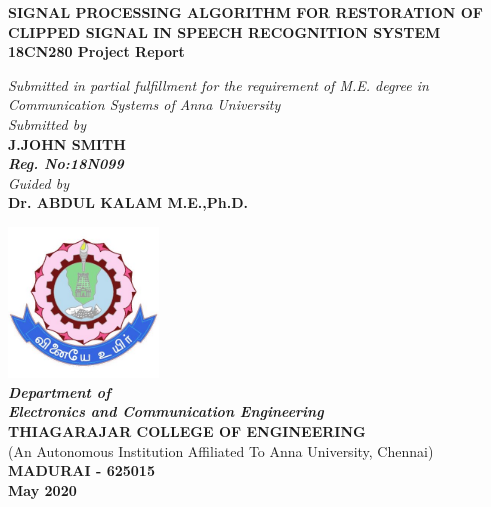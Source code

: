 \documentclass[a4paper,12pt]{report} %
\makeatletter
\newcommand\frontmatter{%
    \cleardoublepage
  \pagenumbering{roman}}
\makeatother
\begin{document}
\frontmatter
{}

\begin{titlepage}
   \begin{center}
 
   \Large
   {\textbf{SIGNAL PROCESSING ALGORITHM FOR
RESTORATION OF CLIPPED SIGNAL IN SPEECH RECOGNITION SYSTEM}}\\
 \large
       \vspace{0.5cm}
        \textbf{18CN280 Project Report }
 
   \vspace{1cm}
  \large
    \textit{Submitted in partial fulfillment for the requirement of M.E. degree in\\
        Communication Systems of Anna University}\\
         \vspace{0.75cm}
  \textit{Submitted by}\\
       \textbf{J.JOHN SMITH}\\
       \textit{\textbf{Reg. No:18N099}}\\
          \vspace{0.5cm}
         \textit{Guided by}\\
       \textbf{Dr. ABDUL KALAM M.E.,Ph.D.}\\
 
       \vfill
 
 
       \includegraphics[width=0.3\textwidth]{TCE}\\
  \large\textit{\textbf{Department of\\ Electronics and Communication Engineering}}\\
      \Large\textbf{THIAGARAJAR COLLEGE OF ENGINEERING}\\
       \normalsize (An Autonomous Institution Affiliated To Anna University, Chennai)\\
        \Large\textbf{MADURAI - 625015}\\
       \large \textbf{May 2020}
 
   \end{center}
\end{titlepage}
\end{document}
